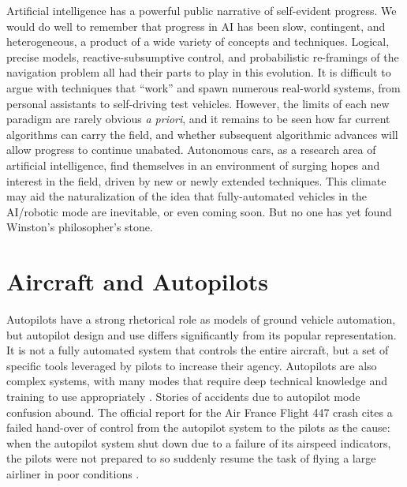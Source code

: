 Artificial intelligence has a powerful public narrative of self-evident
progress. We would do well to remember that  
progress in AI has been slow, contingent, and heterogeneous, a product of a
wide variety of concepts and techniques. Logical, precise models,
reactive-subsumptive control, and probabilistic re-framings of the
navigation problem all had their parts to play in this evolution. It
is difficult to argue with techniques that ``work'' and
spawn numerous real-world systems, from personal assistants to
self-driving test vehicles. However, the limits of each new paradigm are rarely
obvious \emph{a priori}, and it remains to be seen how far current
algorithms can carry the field, and whether subsequent algorithmic
advances will allow progress to continue unabated. Autonomous cars, as a 
research area of artificial intelligence, find themselves in an
environment of surging hopes and interest in the field, driven by new
or newly extended techniques. This climate may aid the
naturalization of the 
idea that fully-automated vehicles in the AI/robotic mode are
inevitable, or even coming soon. But no one has yet found Winston's 
philosopher's stone.


\section{Aircraft and Autopilots}



Autopilots have a strong rhetorical role as
models of ground vehicle automation, but autopilot design and use differs 
significantly from its popular representation. It is not a fully automated
system that controls the entire aircraft, but a set of specific tools
leveraged by pilots to increase their agency. Autopilots are also complex systems, with many modes
that require deep technical knowledge and training to use
appropriately \cite{harrisPsych}. Stories of accidents
due to autopilot mode confusion abound. The official report for
the Air France Flight 447 crash cites a
failed hand-over of control from the autopilot system to the pilots as
the cause:
when the autopilot system shut down due to a failure of its airspeed
indicators, the pilots were not prepared to so suddenly resume the
task of flying a large airliner in poor conditions \cite{AF447}.


